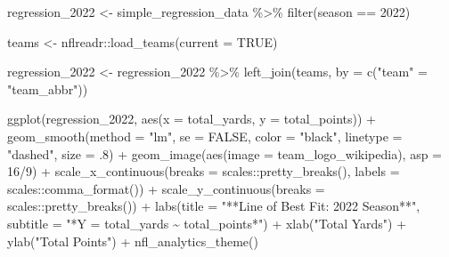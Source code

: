 \documentclass[
  letterpaper,
]{krantz}
\newenvironment{Shaded}{\begin{snugshade}}{\end{snugshade}}
\newcommand{\AttributeTok}[1]{\textcolor[rgb]{0.40,0.45,0.13}{#1}}
\newcommand{\ConstantTok}[1]{\textcolor[rgb]{0.56,0.35,0.01}{#1}}
\newcommand{\DecValTok}[1]{\textcolor[rgb]{0.68,0.00,0.00}{#1}}
\newcommand{\FunctionTok}[1]{\textcolor[rgb]{0.28,0.35,0.67}{#1}}
\newcommand{\NormalTok}[1]{\textcolor[rgb]{0.00,0.23,0.31}{#1}}
\newcommand{\OtherTok}[1]{\textcolor[rgb]{0.00,0.23,0.31}{#1}}
\newcommand{\SpecialCharTok}[1]{\textcolor[rgb]{0.37,0.37,0.37}{#1}}
\newcommand{\StringTok}[1]{\textcolor[rgb]{0.13,0.47,0.30}{#1}}
\begin{document}
\begin{Shaded}
\begin{Highlighting}[]
\NormalTok{regression\_2022 }\OtherTok{\textless{}{-}}\NormalTok{ simple\_regression\_data }\SpecialCharTok{\%\textgreater{}\%}
  \FunctionTok{filter}\NormalTok{(season }\SpecialCharTok{==} \DecValTok{2022}\NormalTok{)}

\NormalTok{teams }\OtherTok{\textless{}{-}}\NormalTok{ nflreadr}\SpecialCharTok{::}\FunctionTok{load\_teams}\NormalTok{(}\AttributeTok{current =} \ConstantTok{TRUE}\NormalTok{)}

\NormalTok{regression\_2022 }\OtherTok{\textless{}{-}}\NormalTok{ regression\_2022 }\SpecialCharTok{\%\textgreater{}\%}
  \FunctionTok{left\_join}\NormalTok{(teams, }\AttributeTok{by =} \FunctionTok{c}\NormalTok{(}\StringTok{"team"} \OtherTok{=} \StringTok{"team\_abbr"}\NormalTok{))}

  \FunctionTok{ggplot}\NormalTok{(regression\_2022, }\FunctionTok{aes}\NormalTok{(}\AttributeTok{x =}\NormalTok{ total\_yards, }\AttributeTok{y =}\NormalTok{ total\_points)) }\SpecialCharTok{+}
  \FunctionTok{geom\_smooth}\NormalTok{(}\AttributeTok{method =} \StringTok{"lm"}\NormalTok{, }\AttributeTok{se =} \ConstantTok{FALSE}\NormalTok{,}
              \AttributeTok{color =} \StringTok{"black"}\NormalTok{,}
              \AttributeTok{linetype =} \StringTok{"dashed"}\NormalTok{,}
              \AttributeTok{size =}\NormalTok{ .}\DecValTok{8}\NormalTok{) }\SpecialCharTok{+}
  \FunctionTok{geom\_image}\NormalTok{(}\FunctionTok{aes}\NormalTok{(}\AttributeTok{image =}\NormalTok{ team\_logo\_wikipedia), }\AttributeTok{asp =} \DecValTok{16}\SpecialCharTok{/}\DecValTok{9}\NormalTok{) }\SpecialCharTok{+}
  \FunctionTok{scale\_x\_continuous}\NormalTok{(}\AttributeTok{breaks =}\NormalTok{ scales}\SpecialCharTok{::}\FunctionTok{pretty\_breaks}\NormalTok{(),}
                     \AttributeTok{labels =}\NormalTok{ scales}\SpecialCharTok{::}\FunctionTok{comma\_format}\NormalTok{()) }\SpecialCharTok{+}
  \FunctionTok{scale\_y\_continuous}\NormalTok{(}\AttributeTok{breaks =}\NormalTok{ scales}\SpecialCharTok{::}\FunctionTok{pretty\_breaks}\NormalTok{()) }\SpecialCharTok{+}
  \FunctionTok{labs}\NormalTok{(}\AttributeTok{title =} \StringTok{"**Line of Best Fit: 2022 Season**"}\NormalTok{,}
       \AttributeTok{subtitle =} \StringTok{"*Y = total\_yards \textasciitilde{} total\_points*"}\NormalTok{) }\SpecialCharTok{+}
  \FunctionTok{xlab}\NormalTok{(}\StringTok{"Total Yards"}\NormalTok{) }\SpecialCharTok{+}
  \FunctionTok{ylab}\NormalTok{(}\StringTok{"Total Points"}\NormalTok{) }\SpecialCharTok{+}
  \FunctionTok{nfl\_analytics\_theme}\NormalTok{()}
\end{Highlighting}
\end{Shaded}
\end{document}
